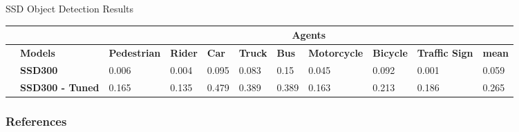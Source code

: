 \documentclass[10pt, aspectratio=169]{beamer}
\begin{document}
\begin{frame}{SSD Object Detection Results}
\begin{table}[]
{\begin{tabular}{cllllllllll}
                                  &                         & \multicolumn{9}{c}{\textbf{Agents}}  \\ \hline
                                  & \multicolumn{1}{l}{\textbf{Models}}         & \multicolumn{1}{l}{\textbf{Pedestrian}} & \multicolumn{1}{l}{\textbf{Rider}} & \multicolumn{1}{l}{\textbf{Car}} & \multicolumn{1}{l}{\textbf{Truck}} & \multicolumn{1}{l}{\textbf{Bus}} & \multicolumn{1}{l}{\textbf{Motorcycle}} & \multicolumn{1}{l}{\textbf{Bicycle}} &\multicolumn{1}{l}{\textbf{Traffic Sign}} & \textbf{mean} \\ \hline
     & \multicolumn{1}{l}{\textbf{SSD300}}         & \multicolumn{1}{l}{0.006}               & \multicolumn{1}{l}{0.004}          & \multicolumn{1}{l}{0.095}        & \multicolumn{1}{l}{0.083}          & \multicolumn{1}{l}{0.15}         & \multicolumn{1}{l}{0.045}               & \multicolumn{1}{l}{0.092}            & \multicolumn{1}{l}{0.001}       &     0.059     \\ \cline{1-11} 
                                  & \multicolumn{1}{l}{\textbf{SSD300 - Tuned}} & \multicolumn{1}{l}{0.165}               & \multicolumn{1}{l}{0.135}          & \multicolumn{1}{l}{0.479}        & \multicolumn{1}{l}{0.389}          & \multicolumn{1}{l}{0.389}        & \multicolumn{1}{l}{0.163}               & \multicolumn{1}{l}{0.213}            & \multicolumn{1}{l}{0.186}    &     0.265        \\ \hline
    \end{tabular}
            }
            \label{map_basic}
        \end{table}


\end{frame}


\begin{frame}[allowframebreaks]
    \frametitle{References}
    
    
\end{frame}
\end{document}
